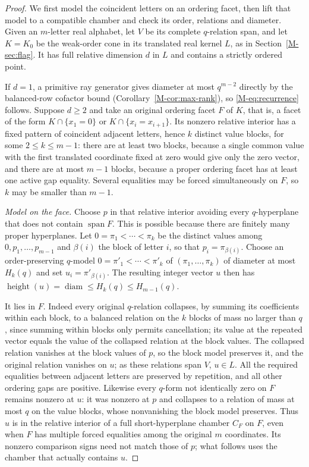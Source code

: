\documentclass[10pt,a4paper]{amsart}
\newcommand{\diam}{\operatorname{diam}}
\newcommand{\height}{\operatorname{height}}
\newcommand{\spn}{\operatorname{span}}
\begin{document}
\begin{proof}
We first model the coincident letters on an ordering facet, then lift
that model to a compatible chamber and check its order, relations and diameter.
Given an $m$-letter real alphabet, let $V$ be its complete $q$-relation span,
and let $K=K_0$ be the weak-order cone in its translated real kernel $L$, as
in Section~\ref{M-sec:flag}. It has full relative dimension $d$ in $L$ and
contains a strictly ordered point.

If $d=1$, a primitive ray generator gives diameter at most $q^{m-2}$ directly
by the balanced-row cofactor bound (Corollary~\ref{M-cor:max-rank}), so
\eqref{M-eq:recurrence} follows. Suppose $d\ge2$ and take an original ordering
facet $F$ of $K$, that is, a facet of the form $K\cap\{x_1=0\}$ or
$K\cap\{x_i=x_{i+1}\}$. Its nonzero relative interior has a fixed pattern of
coincident adjacent letters, hence $k$ distinct value blocks, for some
$2\le k\le m-1$: there are at least two blocks, because a single common value
with the first translated coordinate fixed at zero would give only the zero
vector, and there are at most $m-1$ blocks, because a proper ordering facet
has at least one active gap equality. Several equalities may be forced
simultaneously on $F$, so $k$ may be smaller than $m-1$.

\smallskip\noindent\emph{Model on the face.}
Choose $p$ in that relative interior avoiding every $q$-hyperplane that does
not contain $\spn F$. This is possible because there are finitely many
proper hyperplanes. Let $0=\pi_1<\cdots<\pi_k$ be the distinct values among
$0,p_1,\ldots,p_{m-1}$ and $\beta(i)$ the block of letter $i$, so that
$p_i=\pi_{\beta(i)}$. Choose an order-preserving $q$-model
$0=\pi'_1<\cdots<\pi'_k$ of $(\pi_1,\ldots,\pi_k)$ of diameter at most
$H_k(q)$ and set $u_i=\pi'_{\beta(i)}$. The resulting integer vector $u$
then has $\height(u)=\diam\le H_k(q)\le H_{m-1}(q)$.

It lies in $F$. Indeed every original $q$-relation collapses, by summing its
coefficients within each block, to a balanced relation on the $k$ blocks of
mass no larger than $q$, since summing within blocks only permits
cancellation; its value at the repeated vector equals the value of the
collapsed relation at the block values. The collapsed relation vanishes at
the block values of $p$, so the block model preserves it, and the original
relation vanishes on $u$; as these relations span $V$, $u\in L$. All the
required equalities between adjacent letters are preserved by repetition, and
all other ordering gaps are positive. Likewise every $q$-form not identically
zero on $F$ remains nonzero at $u$: it was nonzero at $p$ and collapses to a
relation of mass at most $q$ on the value blocks, whose nonvanishing the
block model preserves. Thus $u$ is in the relative interior of a full
short-hyperplane chamber $C_F$ on $F$, even when $F$ has multiple forced
equalities among the original $m$ coordinates. Its nonzero comparison signs
need not match those of $p$; what follows uses the chamber that actually
contains $u$.


\end{proof}
\end{document}
